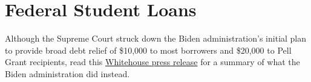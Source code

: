 \documentclass[handout,space,nooutcomes]{ximera}
\begin{document}
\section*{Federal Student Loans}
Although the Supreme Court struck down the Biden administration's initial plan to provide broad debt relief of \$10{,}000 to most borrowers and \$20{,}000 to Pell Grant recipients, read this 
\href{https://bidenwhitehouse.archives.gov/briefing-room/statements-releases/2025/01/13/statement-from-president-joe-biden-on-approving-student-debt-cancellation-for-over-5-million-americans/}{Whitehouse press release} for a summary of what the Biden administration did instead.  
\end{document}
